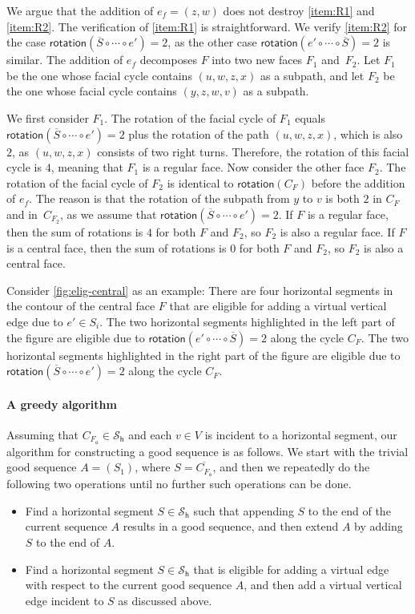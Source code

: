 \documentclass{theoretics}
\newcommand{\FO}{F_\mathsf{o}}
\newcommand{\PH}{\mathcal{S}_\mathsf{h}}
\newcommand{\rotation}{\mathsf{rotation}}
\begin{document}
We argue that the addition of $e_f=(z,w)$ does not  destroy \ref{item:R1} and \ref{item:R2}. The verification of \ref{item:R1} is straightforward. We verify \ref{item:R2} for the case  $\rotation(\overline{S} \circ \cdots \circ e') = 2$, as the other case $\rotation(e' \circ \cdots \circ \overline{S}) = 2$ is similar. The addition of $e_f$ decomposes $F$ into two new faces $F_1$ and~$F_2$. 
Let $F_1$ be the one whose facial cycle contains $(u,w,z,x)$ as a subpath, and let $F_2$ be the one whose facial cycle contains $(y,z,w,v)$ as a subpath.

We first consider $F_1$.
  The rotation of the facial cycle of $F_1$ equals $\rotation(\overline{S} \circ \cdots \circ e') = 2$ plus the rotation of the path $(u,w,z,x)$, which is also $2$, as $(u,w,z,x)$ consists of two right turns. 
Therefore, the rotation of this facial cycle is $4$, meaning that $F_1$ is a regular face.
Now consider the other face $F_2$.  The rotation of the facial cycle of $F_2$ is identical to $\rotation(C_F)$ before the addition of $e_f$. The reason is that the rotation of the subpath from $y$ to $v$ is both $2$ in $C_F$ and in~$C_{F_2}$, as we assume that $\rotation(\overline{S} \circ \cdots \circ e') = 2$. If $F$ is a regular face, then the sum of rotations is $4$ for both $F$ and $F_2$, so $F_2$ is also a regular face. If $F$ is a central face, then the sum of rotations is $0$ for both $F$ and $F_2$, so $F_2$ is also a central face. 

Consider \cref{fig:elig-central} as an example: There are four horizontal segments in the contour of the central face $F$ that are eligible for adding a virtual vertical edge due to $e' \in S_i$.
The two horizontal segments highlighted in the left part of the figure are eligible due to  $\rotation(e' \circ \cdots \circ \overline{S}) = 2$ along the cycle $C_F$.  The two horizontal segments highlighted in the right part of the figure are eligible due to  $\rotation(\overline{S} \circ \cdots \circ e') = 2$ along the cycle $C_F$.



\paragraph{A greedy algorithm} Assuming that $C_{\FO} \in \PH$ and each $v \in V$ is incident to a horizontal segment, our algorithm for constructing a good sequence is as follows. We start with the trivial good sequence $A=(S_1)$, where  $S  = \overline{C_{\FO}}$, 
and then we repeatedly do the following two operations until no further such operations can be done.
\begin{itemize}
    \item Find a horizontal segment $S \in \PH$ such that appending $S$ to the end of the current sequence $A$ results in a good sequence, and then extend $A$ by adding $S$ to the end of $A$.
    \item Find a horizontal segment $S \in \PH$ that is eligible for adding a virtual edge with respect to the current good sequence $A$, and then add a virtual vertical edge incident to $S$ as discussed above.
\end{itemize}
\end{document}
